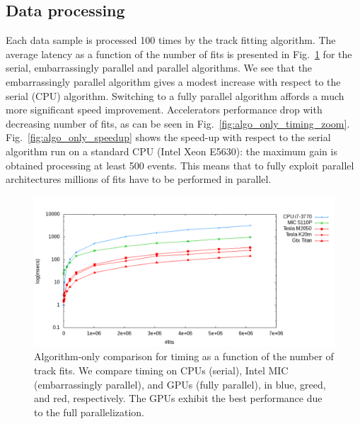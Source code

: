 \documentclass[letterpaper]{jpconf}
\begin{document}
\subsection{Data processing}
Each data sample is processed 100 times by the track fitting algorithm. 
The average latency as a function of the number of fits is presented in 
Fig.~\ref{fig:algo_only_timing} for the serial,
embarrassingly parallel and parallel algorithms. We see that the
embarrassingly parallel algorithm gives a modest increase with respect
to the serial (CPU) algorithm. Switching to a fully parallel algorithm
affords a much more significant speed improvement. 
Accelerators performance drop with decreasing number of fits, as can be seen 
in Fig.~\ref{fig:algo_only_timing_zoom}.
Fig.~\ref{fig:algo_only_speedup} shows the speed-up with respect to the serial 
algorithm run on a standard CPU (Intel Xeon E5630): the maximum gain is 
obtained processing at least 500 events. This means that to fully exploit 
parallel architectures millions of fits have to be performed in parallel.  


%

 \begin{figure}[!tbp]
    \centering
    \includegraphics[width=0.9\linewidth]{figures/TimeComp_MIC}
    \caption{Algorithm-only comparison for timing as a function of the
      number of track fits. We compare timing on CPUs (serial), Intel
      MIC (embarrassingly parallel), and GPUs (fully parallel), in
      blue, greed, and red, respectively. The GPUs exhibit the best
      performance due to the full parallelization. }
    \label{fig:algo_only_timing}
  \end{figure}
 
\end{document}
